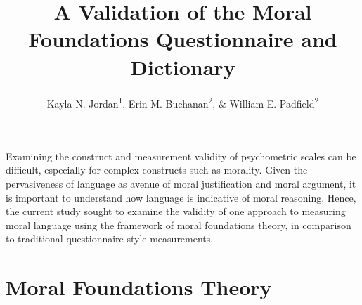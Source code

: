 \documentclass[english,man]{apa6}
\title{A Validation of the Moral Foundations Questionnaire and Dictionary}
\author{Kayla N. Jordan\textsuperscript{1}, Erin M. Buchanan\textsuperscript{2}, \& William E. Padfield\textsuperscript{2}}
\affiliation{
    \vspace{0.5cm}
          \textsuperscript{1} University of Texas - Austin\\
          \textsuperscript{2} Missouri State University  }
\theoremstyle{definition}
\theoremstyle{definition}
\theoremstyle{definition}
\theoremstyle{remark}
\begin{document}
\maketitle

\setcounter{secnumdepth}{0}



Examining the construct and measurement validity of psychometric scales
can be difficult, especially for complex constructs such as morality.
Given the pervasiveness of language as avenue of moral justification and
moral argument, it is important to understand how language is indicative
of moral reasoning. Hence, the current study sought to examine the
validity of one approach to measuring moral language using the framework
of moral foundations theory, in comparison to traditional questionnaire
style measurements.

\section{Moral Foundations Theory}\label{moral-foundations-theory}
\end{document}

